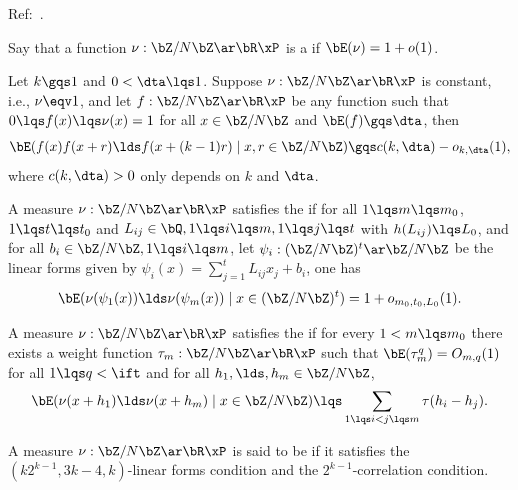 \documentclass[article, a4paper, twoside]{universal}
\begin{document}
\confighead{}{}{}



Ref:~\cite{GT2008Primes}.


\begin{dfn}
    Say that a function $\nu:\bZ/N\bZ\ar\bR\xP$ is a  if $\bE(\nu)=1+o(1)$.
\end{dfn}

\begin{thm}
    Let $k\gqs1$ and $0<\dta\lqs1$. Suppose $\nu:\bZ/N\bZ\ar\bR\xP$ is constant, i.e., $\nu\eqv1$, and let $f:\bZ/N\bZ\ar\bR\xP$ be any function such that $0\lqs f(x)\lqs \nu(x)=1$ for all $x\in\bZ/N\bZ$ and $\bE(f)\gqs\dta$, then
    \[
        \bE(f(x)f(x+r)\lds f(x+(k-1)r)\mid x,r\in\bZ/N\bZ)\gqs c(k,\dta)-o_{k,\dta}(1),
    \]
    where $c(k,\dta)>0$ only depends on $k$ and $\dta$.
\end{thm}

\begin{dfn}
    A measure $\nu:\bZ/N\bZ\ar\bR\xP$ satisfies the  if for all $1\lqs m\lqs m_{0}$, $1\lqs t\lqs t_{0}$ and $L_{ij}\in\bQ, 1\lqs i\lqs m, 1\lqs j\lqs t$ with $h(L_{ij})\lqs L_{0}$, and for all $b_{i}\in\bZ/N\bZ, 1\lqs i\lqs m$, let $\psi_{i}:(\bZ/N\bZ)^{t}\ar\bZ/N\bZ$ be the linear forms given by $\psi_{i}(x)=\sum_{j=1}^{t}L_{ij}x_{j}+b_{i}$, one has
    \[
        \bE(\nu(\psi_{1}(x))\lds\nu(\psi_{m}(x))\mid x\in(\bZ/N\bZ)^{t})=1+o_{m_{0},t_{0},L_{0}}(1).
    \]
\end{dfn}

\begin{dfn}
    A measure $\nu:\bZ/N\bZ\ar\bR\xP$ satisfies the  if for every $1<m\lqs m_{0}$ there exists a weight function $\tau_{m}:\bZ/N\bZ\ar\bR\xP$ such that $\bE(\tau_{m}^{q})=O_{m,q}(1)$ for all $1\lqs q<\ift$ and for all $h_{1},\lds,h_{m}\in\bZ/N\bZ$,
    \[
        \bE(\nu(x+h_{1})\lds\nu(x+h_{m})\mid x\in\bZ/N\bZ)\lqs\sum_{1\lqs i< j\lqs m}\tau(h_{i}-h_{j}).
    \]
\end{dfn}

\begin{dfn}
    A measure $\nu:\bZ/N\bZ\ar\bR\xP$ is said to be  if it satisfies the $(k2^{k-1},3k-4,k)$-linear forms condition and the $2^{k-1}$-correlation condition.
\end{dfn}
\end{document}
